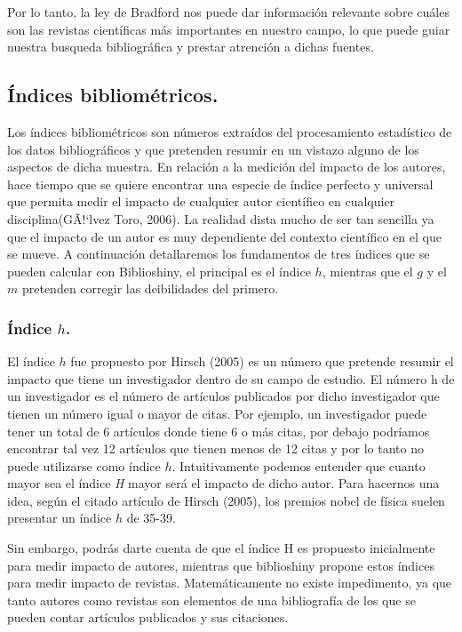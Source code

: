 \documentclass[
]{article}
\begin{document}
Por lo tanto, la ley de Bradford nos puede dar información relevante
sobre cuáles son las revistas científicas más importantes en nuestro
campo, lo que puede guiar nuestra busqueda bibliográfica y prestar
atrención a dichas fuentes.

\hypertarget{uxedndices-bibliomuxe9tricos.}{%
\subsection{Índices
bibliométricos.}\label{uxedndices-bibliomuxe9tricos.}}

Los índices bibliométricos son números extraídos del procesamiento
estadístico de los datos bibliográficos y que pretenden resumir en un
vistazo alguno de los aspectos de dicha muestra. En relación a la
medición del impacto de los autores, hace tiempo que se quiere encontrar
una especie de índice perfecto y universal que permita medir el impacto
de cualquier autor científico en cualquier disciplina(GÃ!{}`lvez Toro,
2006). La realidad dista mucho de ser tan sencilla ya que el impacto de
un autor es muy dependiente del contexto científico en el que se mueve.
A continuación detallaremos los fundamentos de tres índices que se
pueden calcular con Biblioshiny, el principal es el índice \(h\),
mientras que el \(g\) y el \(m\) pretenden corregir las deibilidades del
primero.

\hypertarget{uxedndice-h.}{%
\subsubsection{\texorpdfstring{Índice
\(h\).}{Índice h.}}\label{uxedndice-h.}}

El índice \(h\) fue propuesto por Hirsch (2005) es un número que
pretende resumir el impacto que tiene un investigador dentro de su campo
de estudio. El número h de un investigador es el número de artículos
publicados por dicho investigador que tienen un número igual o mayor de
citas. Por ejemplo, un investigador puede tener un total de 6 artículos
donde tiene 6 o más citas, por debajo podríamos encontrar tal vez 12
artículos que tienen menos de 12 citas y por lo tanto no puede
utilizarse como índice \(h\). Intuitivamente podemos entender que cuanto
mayor sea el índice \emph{H} mayor será el impacto de dicho autor. Para
hacernos una idea, según el citado artículo de Hirsch (2005), los
premios nobel de física suelen presentar un índice \(h\) de 35-39.

Sin embargo, podrás darte cuenta de que el índice H es propuesto
inicialmente para medir impacto de autores, mientras que biblioshiny
propone estos índices para medir impacto de revistas. Matemáticamente no
existe impedimento, ya que tanto autores como revistas son elementos de
una bibliografía de los que se pueden contar artículos publicados y sus
citaciones.
\end{document}
